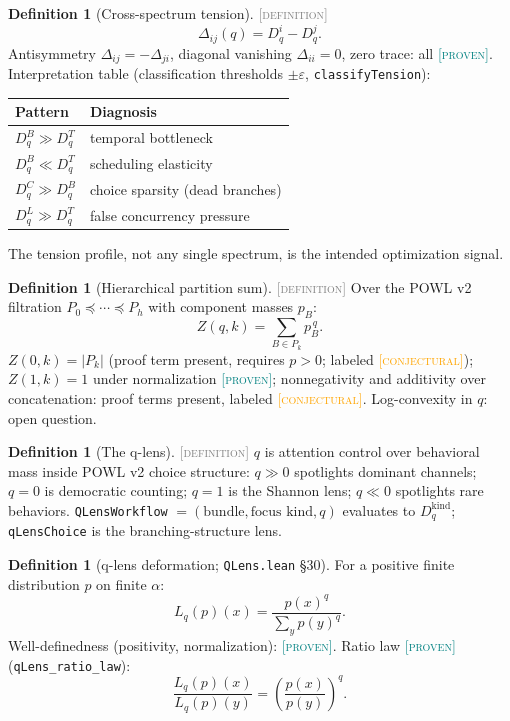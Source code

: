 \documentclass[11pt]{article}
\newcommand{\PROVEN}{\textcolor{teal}{\textsc{[proven]}}}
\newcommand{\DEFINITION}{\textcolor{gray}{\textsc{[definition]}}}
\newcommand{\CONJECTURAL}{\textcolor{orange}{\textsc{[conjectural]}}}
\theoremstyle{plain}
\theoremstyle{definition}
\newtheorem{definition}[theorem]{Definition}
\begin{document}
\begin{definition}[Cross-spectrum tension]\DEFINITION\;
\[
  \Delta_{ij}(q) = D_q^{i} - D_q^{j}.
\]
Antisymmetry $\Delta_{ij} = -\Delta_{ji}$, diagonal vanishing
$\Delta_{ii} = 0$, zero trace: all \PROVEN. Interpretation table
(classification thresholds $\pm\varepsilon$, \texttt{classifyTension}):
\begin{center}
\begin{tabular}{@{}ll@{}}
\toprule
Pattern & Diagnosis \\
\midrule
$D_q^{B} \gg D_q^{T}$ & temporal bottleneck \\
$D_q^{B} \ll D_q^{T}$ & scheduling elasticity \\
$D_q^{C} \gg D_q^{B}$ & choice sparsity (dead branches) \\
$D_q^{L} \gg D_q^{T}$ & false concurrency pressure \\
\bottomrule
\end{tabular}
\end{center}
The tension profile, not any single spectrum, is the intended optimization
signal.
\end{definition}

\begin{definition}[Hierarchical partition sum]\DEFINITION\;
Over the POWL v2 filtration $P_0 \preceq \cdots \preceq P_h$ with component
masses $p_B$:
\[
  Z(q, k) = \sum_{B \in P_k} p_B^{\,q}.
\]
$Z(0,k) = |P_k|$ (proof term present, requires $p > 0$; labeled
\CONJECTURAL); $Z(1,k) = 1$ under normalization \PROVEN; nonnegativity and
additivity over concatenation: proof terms present, labeled \CONJECTURAL.
Log-convexity in $q$: open question.
\end{definition}

\begin{definition}[The q-lens]\DEFINITION\;
$q$ is attention control over behavioral mass inside POWL v2 choice
structure: $q \gg 0$ spotlights dominant channels; $q = 0$ is democratic
counting; $q = 1$ is the Shannon lens; $q \ll 0$ spotlights rare behaviors.
\texttt{QLensWorkflow} $= (\text{bundle}, \text{focus kind}, q)$ evaluates to
$D_q^{\mathrm{kind}}$; \texttt{qLensChoice} is the branching-structure lens.
\end{definition}

\begin{definition}[q-lens deformation; \texttt{QLens.lean} \S30]\;
For a positive finite distribution $p$ on finite $\alpha$:
\[
  L_q(p)(x) = \frac{p(x)^q}{\sum_{y} p(y)^q}.
\]
Well-definedness (positivity, normalization): \PROVEN. Ratio law
\PROVEN{} (\texttt{qLens\_ratio\_law}):
\[
  \frac{L_q(p)(x)}{L_q(p)(y)} = \left(\frac{p(x)}{p(y)}\right)^{q}.
\]
\end{definition}
\end{document}
